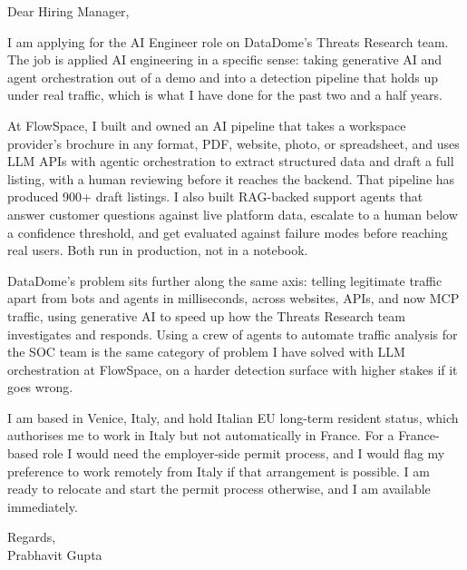 \documentclass[a4paper,11pt]{article}
\begin{document}
Dear Hiring Manager,

I am applying for the AI Engineer role on DataDome's Threats Research team. The job is applied AI engineering in a specific sense: taking generative AI and agent orchestration out of a demo and into a detection pipeline that holds up under real traffic, which is what I have done for the past two and a half years.

At FlowSpace, I built and owned an AI pipeline that takes a workspace provider's brochure in any format, PDF, website, photo, or spreadsheet, and uses LLM APIs with agentic orchestration to extract structured data and draft a full listing, with a human reviewing before it reaches the backend. That pipeline has produced 900+ draft listings. I also built RAG-backed support agents that answer customer questions against live platform data, escalate to a human below a confidence threshold, and get evaluated against failure modes before reaching real users. Both run in production, not in a notebook.

DataDome's problem sits further along the same axis: telling legitimate traffic apart from bots and agents in milliseconds, across websites, APIs, and now MCP traffic, using generative AI to speed up how the Threats Research team investigates and responds. Using a crew of agents to automate traffic analysis for the SOC team is the same category of problem I have solved with LLM orchestration at FlowSpace, on a harder detection surface with higher stakes if it goes wrong.

I am based in Venice, Italy, and hold Italian EU long-term resident status, which authorises me to work in Italy but not automatically in France. For a France-based role I would need the employer-side permit process, and I would flag my preference to work remotely from Italy if that arrangement is possible. I am ready to relocate and start the permit process otherwise, and I am available immediately.

Regards,\\
Prabhavit Gupta
\end{document}
